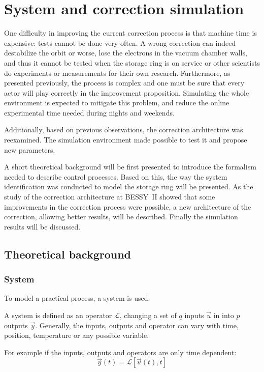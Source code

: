 
\chapter{System and correction simulation}
\label{sec:control}
One difficulty in improving the current correction process is that machine time is expensive: tests cannot be done very often. A wrong correction can indeed destabilize the orbit or worse, lose the electrons in the vacuum chamber walls, and thus it cannot be tested when the storage ring is on service or other scientists do experiments or measurements for their own research. Furthermore, as presented previously, the process is complex and one must be sure that every actor will play correctly in the improvement proposition. Simulating the whole environment is expected to mitigate this problem, and reduce the online experimental time needed during nights and weekends.

Additionally, based on previous observations, the correction architecture was reexamined. The simulation environment made possible to test it and propose new parameters.

A short theoretical background will be first presented to introduce the formalism needed to describe control processes. Based on this, the way the system identification was conducted to model the storage ring will be presented. As the study of the correction architecture at BESSY~II showed that some improvements in the correction process were possible, a new architecture of the correction, allowing better results, will be described. Finally the simulation results will be discussed.

\section{Theoretical background}
\subsection{System}
To model a practical process, a system is used. 

A system is defined as an operator $\mathcal{L}$, changing a set of $q$ inputs $\vec{u}$ in into $p$ outputs $\vec{y}$. Generally, the inputs, outputs and operator can vary with time, position, temperature or any possible variable.

For example if the inputs, outputs and operators are only time dependent:
\begin{equation}
	\vec{y}(t) = \mathcal{L}[\vec{u}(t),t]
\end{equation}

